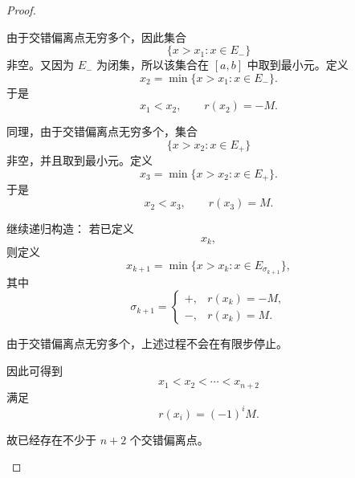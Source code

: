 \begin{proof}
\begin{enumerate}
由于交错偏离点无穷多个，因此集合
$$
\{x>x_1:x\in E_-\}
$$
非空。又因为 $E_-$ 为闭集，所以该集合在 $[a,b]$ 中取到最小元。定义
$$
x_2=\min\{x>x_1:x\in E_-\}.
$$
于是
$$
x_1<x_2,\qquad r(x_2)=-M.
$$

同理，由于交错偏离点无穷多个，集合
$$
\{x>x_2:x\in E_+\}
$$
非空，并且取到最小元。定义
$$
x_3=\min\{x>x_2:x\in E_+\}.
$$
于是
$$
x_2<x_3,\qquad r(x_3)=M.
$$

继续递归构造：
若已定义
$$
x_k,
$$
则定义
$$
x_{k+1}
=
\min\{x>x_k:x\in E_{\sigma_{k+1}}\},
$$
其中
$$
\sigma_{k+1}=
\begin{cases}
+,& r(x_k)=-M,\\
-,& r(x_k)=M.
\end{cases}
$$

由于交错偏离点无穷多个，上述过程不会在有限步停止。

因此可得到
$$
x_1<x_2<\cdots<x_{n+2}
$$
满足
$$
r(x_i)=(-1)^iM.
$$

故已经存在不少于 $n+2$ 个交错偏离点。
\end{enumerate}
\end{proof}
